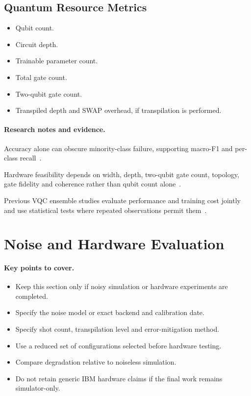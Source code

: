 \documentclass[]{UCD_CS_MSc_AAI_Report}
\newcommand{\benchmark}[1]{{\color{violet}#1}}
\newcommand{\sectionbrief}{\paragraph{Key points to cover.}}
\newcommand{\researchnotes}{\paragraph{Research notes and evidence.}}
\begin{document}
\subsection{Quantum Resource Metrics}
\begin{itemize}
    \item Qubit count.
    \item Circuit depth.
    \item Trainable parameter count.
    \item Total gate count.
    \item Two-qubit gate count.
    \item Transpiled depth and SWAP overhead, if transpilation is performed.
\end{itemize}

\researchnotes
\begin{itemize}
    \benchmark{\item Accuracy alone can obscure minority-class failure, supporting macro-F1 and per-class recall~\cite{demir_modified_2018,vasan_exploring_2025}.}
    \benchmark{\item Hardware feasibility depends on width, depth, two-qubit gate count, topology, gate fidelity and coherence rather than qubit count alone~\cite{resch_quantum_2019}.}
    \benchmark{\item Previous VQC ensemble studies evaluate performance and training cost jointly and use statistical tests where repeated observations permit them~\cite{radojicic_reducing_2026}.}
\end{itemize}

\section{Noise and Hardware Evaluation}
\label{sec:method-noise-hardware}

\sectionbrief
\begin{itemize}
    \item Keep this section only if noisy simulation or hardware experiments are completed.
    \item Specify the noise model or exact backend and calibration date.
    \item Specify shot count, transpilation level and error-mitigation method.
    \item Use a reduced set of configurations selected before hardware testing.
    \item Compare degradation relative to noiseless simulation.
    \item Do not retain generic IBM hardware claims if the final work remains simulator-only.
\end{itemize}
\end{document}

